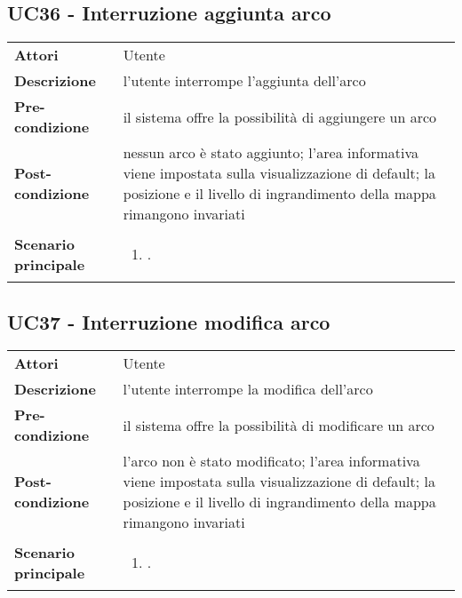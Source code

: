 \subsection{UC36 - Interruzione aggiunta arco} 
\label{sssec:UC36} 
\def\arraystretch{1.5}
\begin{tabularx}{\textwidth}{l|p{}}
	\rowcolor{I} \multicolumn{2}{c}{\color{white}\textbf{UC36 - Interruzione aggiunta arco}} \\
	\toprule
	\endhead
	\textbf{Attori} & Utente\\
	\textbf{Descrizione} & l'utente interrompe l'aggiunta dell'arco\\
	\textbf{Pre-condizione} & il sistema offre la possibilità di aggiungere un arco\\
	\textbf{Post-condizione} & nessun arco è stato aggiunto; l'area informativa viene impostata sulla visualizzazione di default; la posizione e il livello di ingrandimento della mappa rimangono invariati\\
	\textbf{Scenario principale} & \vspace{-1.2em}\begin{enumerate}[leftmargin=*,noitemsep,nosep]
		\item \nameref{sssec:UC36}.
	\end{enumerate}\\
	\bottomrule
\end{tabularx}
\subsection{UC37 - Interruzione modifica arco} 
\label{sssec:UC37} 
\def\arraystretch{1.5}
\begin{tabularx}{\textwidth}{l|p{}}
	\rowcolor{I} \multicolumn{2}{c}{\color{white}\textbf{UC37 - Interruzione modifica arco}} \\
	\toprule
	\endhead
	\textbf{Attori} & Utente\\
	\textbf{Descrizione} & l'utente interrompe la modifica dell'arco\\
	\textbf{Pre-condizione} & il sistema offre la possibilità di modificare un arco\\
	\textbf{Post-condizione} & l'arco non è stato modificato; l'area informativa viene impostata sulla visualizzazione di default; la posizione e il livello di ingrandimento della mappa rimangono invariati\\
	\textbf{Scenario principale} & \vspace{-1.2em}\begin{enumerate}[leftmargin=*,noitemsep,nosep]
		\item \nameref{sssec:UC37}.
	\end{enumerate}\\
	\bottomrule
\end{tabularx}
